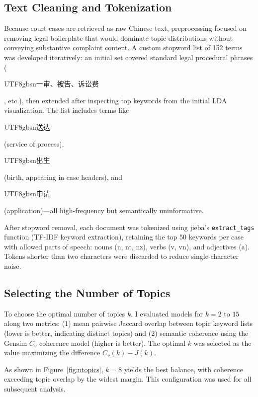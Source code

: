 \documentclass[10pt,letterpaper]{article}
\begin{document}
\subsection{Text Cleaning and Tokenization}

Because court cases are retrieved as raw Chinese text, preprocessing focused on removing legal boilerplate that would dominate topic distributions without conveying substantive complaint content. A custom stopword list of 152 terms was developed iteratively: an initial set covered standard legal procedural phrases (\begin{CJK}{UTF8}{gbsn}一审、被告、诉讼费\end{CJK}, etc.), then extended after inspecting top keywords from the initial LDA visualization. The list includes terms like \begin{CJK}{UTF8}{gbsn}送达\end{CJK} (service of process), \begin{CJK}{UTF8}{gbsn}出生\end{CJK} (birth, appearing in case headers), and \begin{CJK}{UTF8}{gbsn}申请\end{CJK} (application)---all high-frequency but semantically uninformative.

After stopword removal, each document was tokenized using jieba's \texttt{extract\_tags} function (TF-IDF keyword extraction), retaining the top 50 keywords per case with allowed parts of speech: nouns (n, nt, nz), verbs (v, vn), and adjectives (a). Tokens shorter than two characters were discarded to reduce single-character noise.

\subsection{Selecting the Number of Topics}

To choose the optimal number of topics $k$, I evaluated models for $k = 2$ to $15$ along two metrics: (1) mean pairwise Jaccard overlap between topic keyword lists (lower is better, indicating distinct topics) and (2) semantic coherence using the Gensim $C_v$ coherence model (higher is better). The optimal $k$ was selected as the value maximizing the difference $C_v(k) - \overline{J}(k)$.

As shown in Figure~\ref{fig:ntopics}, $k = 8$ yields the best balance, with coherence exceeding topic overlap by the widest margin. This configuration was used for all subsequent analysis.
\end{document}
